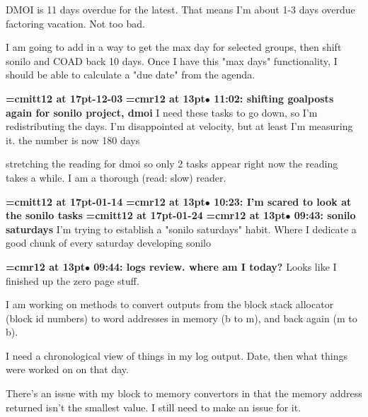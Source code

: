 DMOI is 11 days overdue for the latest. That means I'm about 1-3 days overdue factoring vacation. Not too bad.
\par

I am going to add in a way to get the max day for selected groups, then shift sonilo and COAD back 10 days. Once I have this "max days" functionality, I should be able to calculate a "due date" from the agenda.
\par

{\medskip\noindent\bf\font\titlefont=cmitt12 at 17pt-12-03}\medskip
{\smallskip\noindent\bf\font\titlefont=cmr12 at 13pt\titlefont $\bullet$ 11:02: shifting goalposts again for sonilo project, dmoi}\smallskip
I need these tasks to go down, so I'm redistributing the days. I'm disappointed at velocity, but at least I'm measuring it. the number is now 180 days
\par

stretching the reading for dmoi so only 2 tasks appear right now the reading takes a while. I am a thorough (read: slow) reader.
\par

{\medskip\noindent\bf\font\titlefont=cmitt12 at 17pt-01-14}\medskip
{\smallskip\noindent\bf\font\titlefont=cmr12 at 13pt\titlefont $\bullet$ 10:23: I'm scared to look at the sonilo tasks}\smallskip
{\medskip\noindent\bf\font\titlefont=cmitt12 at 17pt-01-24}\medskip
{\smallskip\noindent\bf\font\titlefont=cmr12 at 13pt\titlefont $\bullet$ 09:43: sonilo saturdays}\smallskip
I'm trying to establish a "sonilo saturdays" habit. Where I dedicate a good chunk of every saturday developing sonilo
\par

{\smallskip\noindent\bf\font\titlefont=cmr12 at 13pt\titlefont $\bullet$ 09:44: logs review. where am I today?}\smallskip
Looks like I finished up the zero page stuff.
\par

I am working on methods to convert outputs from the block stack allocator (block id numbers) to word addresses in memory (b to m), and back again (m to b).
\par

I need a chronological view of things in my log output. Date, then what things were worked on on that day.
\par

There's an issue with my block to memory convertors in that the memory address returned isn't the smallest value. I still need to make an issue for it.
\par

